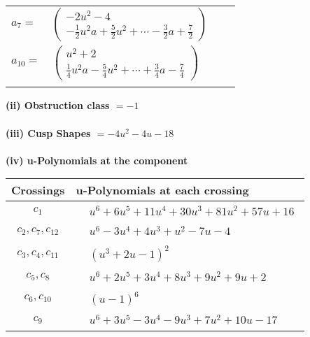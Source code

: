 \documentclass[1p]{elsarticle_modified}
\theoremstyle{definition}
\begin{document}
\begin{tabular}{m{7pt} m{180pt} m{7pt} m{180pt} }
\flushright $a_{7}=$&$\begin{pmatrix}-2 u^2-4\\-\frac{1}{2} u^2 a+\frac{5}{2} u^2+\cdots-\frac{3}{2} a+\frac{7}{2}\end{pmatrix}$ \\
\flushright $a_{10}=$&$\begin{pmatrix}u^2+2\\\frac{1}{4} u^2 a-\frac{5}{4} u^2+\cdots+\frac{3}{4} a-\frac{7}{4}\end{pmatrix}$\\&\end{tabular}
\flushleft \textbf{(ii) Obstruction class $= -1$}\\~\\
\flushleft \textbf{(iii) Cusp Shapes $= -4 u^2-4 u-18$}\\~\\
\newpage\renewcommand{\arraystretch}{1}
\flushleft \textbf{(iv) u-Polynomials at the component}\newline \\
\begin{tabular}{m{50pt}|m{274pt}}
Crossings & \hspace{64pt}u-Polynomials at each crossing \\
\hline $$\begin{aligned}c_{1}\end{aligned}$$&$\begin{aligned}
&u^6+6 u^5+11 u^4+30 u^3+81 u^2+57 u+16
\end{aligned}$\\
\hline $$\begin{aligned}c_{2},c_{7},c_{12}\end{aligned}$$&$\begin{aligned}
&u^6-3 u^4+4 u^3+u^2-7 u-4
\end{aligned}$\\
\hline $$\begin{aligned}c_{3},c_{4},c_{11}\end{aligned}$$&$\begin{aligned}
&(u^3+2 u-1)^2
\end{aligned}$\\
\hline $$\begin{aligned}c_{5},c_{8}\end{aligned}$$&$\begin{aligned}
&u^6+2 u^5+3 u^4+8 u^3+9 u^2+9 u+2
\end{aligned}$\\
\hline $$\begin{aligned}c_{6},c_{10}\end{aligned}$$&$\begin{aligned}
&(u-1)^6
\end{aligned}$\\
\hline $$\begin{aligned}c_{9}\end{aligned}$$&$\begin{aligned}
&u^6+3 u^5-3 u^4-9 u^3+7 u^2+10 u-17
\end{aligned}$\\
\hline
\end{tabular}\\~\\
\end{document}
